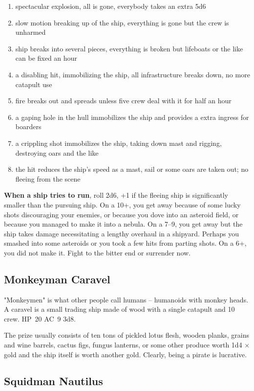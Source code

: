 \documentclass[11pt]{bxart}
\begin{document}
\begin{enumerate}
\item spectacular explosion, all is gone, everybody takes an extra 5d6
\item slow motion breaking up of the ship, everything is gone but the
  crew is unharmed
\item ship breaks into several pieces, everything is broken but
  lifeboats or the like can be fixed an hour
\item a disabling hit, immobilizing the ship, all infrastructure
  breaks down, no more catapult use
\item fire breaks out and spreads unless five crew deal with it for
  half an hour
\item a gaping hole in the hull immobilizes the ship and provides a
  extra ingress for boarders
\item a crippling shot immobilizes the ship, taking down mast and
  rigging, destroying oars and the like
\item the hit reduces the ship's speed as a mast, sail or some oars
  are taken out; no fleeing from the scene
\end{enumerate}

\textbf{When a ship tries to run}, roll 2d6, +1 if the fleeing ship is
significantly smaller than the pursuing ship. On a 10+, you get away
because of some lucky shots discouraging your enemies, or because you
dove into an asteroid field, or because you managed to make it into a
nebula. On a 7--9, you get away but the ship takes damage
necessitating a lengthy overhaul in a shipyard. Perhaps you smashed
into some asteroids or you took a few hits from parting shots. On a
6+, you did not make it. Fight to the bitter end or surrender now.

\subsection{Monkeyman Caravel}

"Monkeymen" is what other people call humans – humanoids with monkey
heads. A caravel is a small trading ship made of wood with a single
catapult and 10 crew. HP~20 AC~9 3d8.

The prize usually consists of ten tons of pickled lotus flesh, wooden
planks, grains and wine barrels, cactus figs, fungus lanterns, or some
other produce worth 1d4 × \unit[10,000]{gold} and the ship itself is
worth another \unit[10,000]{gold}. Clearly, being a pirate is
lucrative.

\subsection{Squidman Nautilus}
\end{document}
